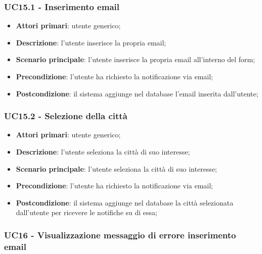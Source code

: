 \subsubsection{UC15.1 - Inserimento email}\label{CasiDUsoCasiDUsoFacoltativiTraUnUtenteEIlFrontEndElencoCasiDUsoUC15.1InserimentoEmail}

\begin{itemize}
	\item \textbf{Attori primari}: utente generico;
	\item \textbf{Descrizione}: l'utente inserisce la propria email;
	\item \textbf{Scenario principale}: l'utente inserisce la propria email all'interno del form;
	\item \textbf{Precondizione}: l'utente ha richiesto la notificazione via email;
	\item \textbf{Postcondizione}: il sistema aggiunge nel database l'email inserita dall'utente;
\end{itemize}

\subsubsection{UC15.2 - Selezione della città}\label{CasiDUsoCasiDUsoFacoltativiTraUnUtenteEIlFrontEndElencoCasiDUsoUC15.2SelezioneCitta}

\begin{itemize}
	\item \textbf{Attori primari}: utente generico;
	\item \textbf{Descrizione}: l'utente seleziona la città di suo interesse;
	\item \textbf{Scenario principale}: l'utente seleziona la città di suo interesse;
	\item \textbf{Precondizione}: l'utente ha richiesto la notificazione via email;
	\item \textbf{Postcondizione}: il sistema aggiunge nel database la città selezionata dall'utente per ricevere le notifiche su di essa;
\end{itemize}


\subsubsection{UC16 - Visualizzazione messaggio di errore inserimento email}\label{CasiDUsoCasiDUsoFacoltativiTraUnUtenteEIlFrontEndElencoCasiDUsoUC16VisualizzazioneMessaggioDiErroreEmailErrata}

